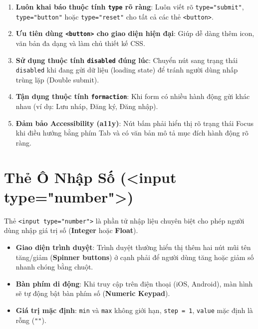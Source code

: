 \documentclass[11pt,oneside]{book}
\newcommand{\codeinline}[1]{\textcolor{accentOrange}{\texttt{#1}}}
\newcommand{\term}[1]{\textbf{\textcolor{primaryBlue}{#1}}}
\begin{document}
\begin{tipBox}
\begin{enumerate}[leftmargin=1.5em, itemsep=2pt, parsep=0pt]
    \item \textbf{Luôn khai báo thuộc tính \codeinline{type} rõ ràng}: Luôn viết rõ \codeinline{type="submit"}, \codeinline{type="button"} hoặc \codeinline{type="reset"} cho tất cả các thẻ \codeinline{<button>}.
    \item \textbf{Ưu tiên dùng \codeinline{<button>} cho giao diện hiện đại}: Giúp dễ dàng thêm icon, văn bản đa dạng và làm chủ thiết kế CSS.
    \item \textbf{Sử dụng thuộc tính \codeinline{disabled} đúng lúc}: Chuyển nút sang trạng thái \codeinline{disabled} khi đang gửi dữ liệu (loading state) để tránh người dùng nhấp trùng lặp (Double submit).
    \item \textbf{Tận dụng thuộc tính \codeinline{formaction}}: Khi form có nhiều hành động gửi khác nhau (ví dụ: Lưu nháp, Đăng ký, Đăng nhập).
    \item \textbf{Đảm bảo Accessibility (a11y)}: Nút bấm phải hiển thị rõ trạng thái Focus khi điều hướng bằng phím Tab và có văn bản mô tả mục đích hành động rõ ràng.
\end{enumerate}
\end{tipBox}

\section[Thẻ Ô Nhập Số]{Thẻ Ô Nhập Số (<input type="number">)}
\label{sec:html_number}

\begin{conceptBox}[Định Nghĩa Thẻ Ô Nhập Số input type="number"]
Thẻ \codeinline{<input type="number">} là phần tử nhập liệu chuyên biệt cho phép người dùng nhập giá trị số (\term{Integer} hoặc \term{Float}). 
\begin{itemize}[leftmargin=1.5em, itemsep=2pt, parsep=0pt]
    \item \textbf{Giao diện trình duyệt}: Trình duyệt thường hiển thị thêm hai nút mũi tên tăng/giảm (\term{Spinner buttons}) ở cạnh phải để người dùng tăng hoặc giảm số nhanh chóng bằng chuột.
    \item \textbf{Bàn phím di động}: Khi truy cập trên điện thoại (iOS, Android), màn hình sẽ tự động bật bàn phím số (\term{Numeric Keypad}).
    \item \textbf{Giá trị mặc định}: \codeinline{min} và \codeinline{max} không giới hạn, \codeinline{step = 1}, \codeinline{value} mặc định là rỗng (\codeinline{""}).
\end{itemize}
\end{conceptBox}
\end{document}
